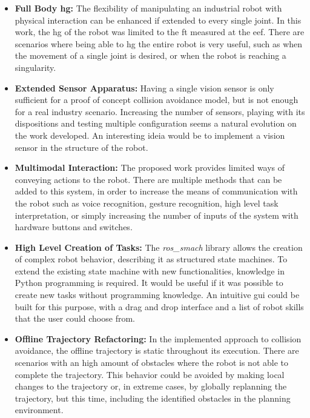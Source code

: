 \begin{itemize}
    \item \textbf{Full Body \ac{hg}: }The flexibility of manipulating an industrial robot with physical interaction can be enhanced if extended to every single joint. In this work, the \ac{hg} of the robot was limited to the \ac{ft} measured at the \ac{eef}. There are scenarios where being able to \ac{hg} the entire robot is very useful, such as when the movement of a single joint is desired, or when the robot is reaching a singularity.
    \item \textbf{Extended Sensor Apparatus: }Having a single vision sensor is only sufficient for a proof of concept collision avoidance model, but is not enough for a real industry scenario. Increasing the number of sensors, playing with its dispositions and testing multiple configuration seems a natural evolution on the work developed. An interesting ideia would be to implement a vision sensor in the structure of the robot.
    \item \textbf{Multimodal Interaction: }The proposed work provides limited ways of conveying actions to the robot. There are multiple methods that can be added to this system, in order to increase the means of communication with the robot such as voice recognition, gesture recognition, high level task interpretation, or simply increasing the number of inputs of the system with hardware buttons and switches.
    \item \textbf{High Level Creation of Tasks: }The \textit{ros\_smach} library allows the creation of complex robot behavior, describing it as structured state machines. To extend the existing state machine with new functionalities, knowledge in Python programming is required. It would be useful if it was possible to create new tasks without programming knowledge. An intuitive \ac{gui} could be built for this purpose, with a drag and drop interface and a list of robot skills that the user could choose from.
    \item \textbf{Offline Trajectory Refactoring: }In the implemented approach to collision avoidance, the offline trajectory is static throughout its execution. There are scenarios with an high amount of obstacles where the robot is not able to complete the trajectory. This behavior could be avoided by making local changes to the trajectory or, in extreme cases, by globally replanning the trajectory, but this time, including the identified obstacles in the planning environment.
\end{itemize}
